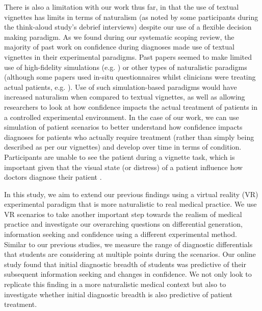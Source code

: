 \documentclass[a4paper, nobind]{templates/ociamthesis}
\begin{document}
\hfill\break
There is also a limitation with our work thus far, in that the use of textual vignettes has limits in terms of naturalism (as noted by some participants during the think-aloud study's debrief interviews) despite our use of a flexible decision making paradigm. As we found during our systematic scoping review, the majority of past work on confidence during diagnoses made use of textual vignettes in their experimental paradigms. Past papers seemed to make limited use of high-fidelity simulations (e.g. \autocite{yang_effect_2012,garbayo_metacognitive_2023}) or other types of naturalistic paradigms (although some papers used in-situ questionnaires whilst clinicians were treating actual patients, e.g. \autocite{calman_variability_1992,hageman_surgeon_2013,gupta_associations_2023}). Use of such simulation-based paradigms would have increased naturalism when compared to textual vignettes, as well as allowing researchers to look at how confidence impacts the actual treatment of patients in a controlled experimental environment. In the case of our work, we can use simulation of patient scenarios to better understand how confidence impacts diagnoses for patients who actually require treatment (rather than simply being described as per our vignettes) and develop over time in terms of condition. Participants are unable to see the patient during a vignette task, which is important given that the visual state (or distress) of a patient influence how doctors diagnose their patient \autocite{brooks_difficulty_2000,sibbald_eyeballing_2017}.

\hfill\break
In this study, we aim to extend our previous findings using a virtual reality (VR) experimental paradigm that is more naturalistic to real medical practice. We use VR scenarios to take another important step towards the realism of medical practice and investigate our overarching questions on differential generation, information seeking and confidence using a different experimental method. Similar to our previous studies, we measure the range of diagnostic differentials that students are considering at multiple points during the scenarios. Our online study found that initial diagnostic breadth of students was predictive of their subsequent information seeking and changes in confidence. We not only look to replicate this finding in a more naturalistic medical context but also to investigate whether initial diagnostic breadth is also predictive of patient treatment.
\end{document}
